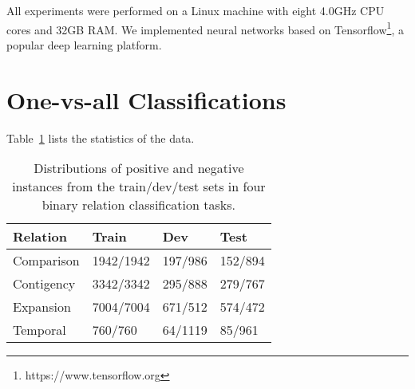 \documentclass[11pt,a4paper]{article}
\begin{document}
\begin{appendices}
All experiments were performed on a Linux machine with eight 4.0GHz CPU cores and 32GB RAM. We implemented neural networks based on Tensorflow\footnote{https://www.tensorflow.org}, a popular deep learning platform.

\section{One-vs-all Classifications}
Table~\ref{tab:binary-data} lists the statistics of the data.
\begin{table}[!h]
  \centering
  \normalsize
\begin{tabular}{l l l l } 
\hline
Relation &Train&Dev&Test\\ 
\hline
Comparison&1942/1942&197/986&152/894\\
Contigency&3342/3342&295/888&279/767\\
Expansion&7004/7004&671/512&574/472\\
Temporal&760/760&64/1119&85/961\\
\hline
\end{tabular}
	\caption{Distributions of positive and negative instances from the train/dev/test sets in four binary relation classification tasks.} 
\label{tab:binary-data}
\end{table}

\end{appendices}
\end{document}
